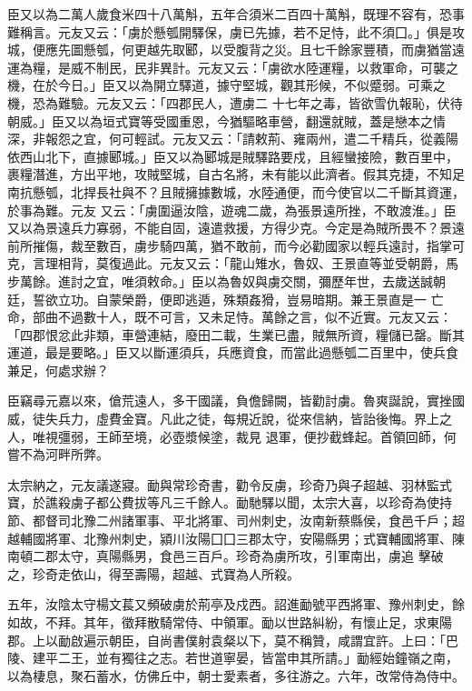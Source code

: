 \begin{pinyinscope}
 臣又以為二萬人歲食米四十八萬斛，五年合須米二百四十萬斛，既理不容有，恐事難稱言。元友又云：「虜於懸瓠開驛保，虜已先據，若不足恃，此不須囗。」俱是攻城，便應先圖懸瓠，何更越先取郾，以受腹背之災。且七千餘家豐積，而虜猶當遠運為糧，是威不制民，民非異計。元友又云：「虜欲水陸運糧，以救軍命，可襲之機，在於今日。」臣又以為開立驛道，據守堅城，觀其形候，不似蹙弱。可乘之機，恐為難驗。元友又云：「四郡民人，遭虜二
 十七年之毒，皆欲雪仇報恥，伏待朝威。」臣又以為垣式寶等受國重恩，今猶驅略車營，翻還就賊，蓋是戀本之情深，非報怨之宜，何可輕試。元友又云：「請敕荊、雍兩州，遣二千精兵，從義陽依西山北下，直據郾城。」臣又以為郾城是賊驛路要戍，且經蠻接險，數百里中，裹糧潛進，方出平地，攻賊堅城，自古名將，未有能以此濟者。假其克捷，不知足南抗懸瓠，北捍長社與不？且賊擁據數城，水陸通便，而今使官以二千斷其資運，於事為難。元友
 又云：「虜圍逼汝陰，遊魂二歲，為張景遠所挫，不敢渡淮。」臣又以為景遠兵力寡弱，不能自固，遠遣救援，方得少克。今定是為賊所畏不？景遠前所摧傷，裁至數百，虜步騎四萬，猶不敢前，而今必勸國家以輕兵遠討，指掌可克，言理相背，莫復過此。元友又云：「龍山雉水，魯奴、王景直等並受朝爵，馬步萬餘。進討之宜，唯須敕命。」臣以為魯奴與虜交關，彌歷年世，去歲送誠朝廷，誓欲立功。自蒙榮爵，便即逃遁，殊類姦猾，豈易暗期。兼王景直是一
 亡命，部曲不過數十人，既不可言，又未足恃。萬餘之言，似不近實。元友又云：「四郡恨忿此非類，車營連結，廢田二載，生業已盡，賊無所資，糧儲已罄。斷其運道，最是要略。」臣又以斷運須兵，兵應資食，而當此過懸瓠二百里中，使兵食兼足，何處求辦？



 臣竊尋元嘉以來，傖荒遠人，多干國議，負儋歸闕，皆勸討虜。魯爽誕說，實挫國威，徒失兵力，虛費金寶。凡此之徒，每規近說，從來信納，皆詒後悔。界上之人，唯視彊弱，王師至境，必壺漿候塗，裁見
 退軍，便抄截蜂起。首領回師，何嘗不為河畔所弊。



 太宗納之，元友議遂寢。勔與常珍奇書，勸令反虜，珍奇乃與子超越、羽林監式寶，於譙殺虜子都公費拔等凡三千餘人。勔馳驛以聞，太宗大喜，以珍奇為使持節、都督司北豫二州諸軍事、平北將軍、司州刺史，汝南新蔡縣侯，食邑千戶；超越輔國將軍、北豫州刺史，潁川汝陽囗囗三郡太守，安陽縣男；式寶輔國將軍、陳南頓二郡太守，真陽縣男，食邑三百戶。珍奇為虜所攻，引軍南出，虜追
 擊破之，珍奇走依山，得至壽陽，超越、式寶為人所殺。



 五年，汝陰太守楊文萇又頻破虜於荊亭及戍西。詔進勔號平西將軍、豫州刺史，餘如故，不拜。其年，徵拜散騎常侍、中領軍。勔以世路糾紛，有懷止足，求東陽郡。上以勔啟遍示朝臣，自尚書僕射袁粲以下，莫不稱贊，咸謂宜許。上曰：「巴陵、建平二王，並有獨往之志。若世道寧晏，皆當申其所請。」勔經始鐘嶺之南，以為棲息，聚石蓄水，仿佛丘中，朝士愛素者，多往游之。六年，改常侍為侍中。




\end{pinyinscope}
